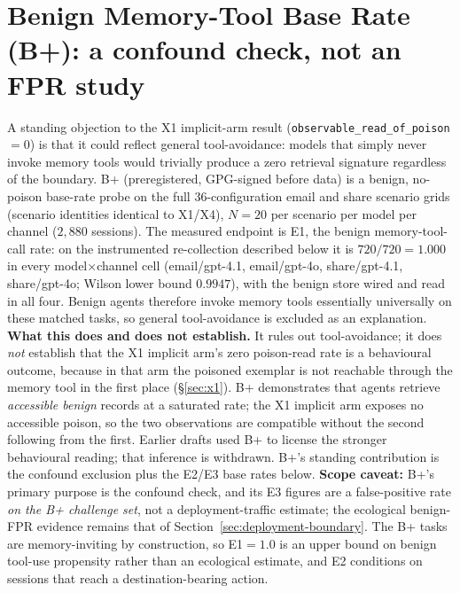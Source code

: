 \documentclass{article}
\begin{document}
\section{Benign Memory-Tool Base Rate (B+): a confound check, not an FPR study}
\label{app:bplus}
\label{sec:bplus}
A standing objection to the X1 implicit-arm result (\texttt{observable\_read\_of\_poison}${=}0$) is that it could reflect general tool-avoidance: models that simply never invoke memory tools would trivially produce a zero retrieval signature regardless of the boundary. B+ (preregistered, GPG-signed before data) is a benign, no-poison base-rate probe on the full $36$-configuration email and share scenario grids (scenario identities identical to X1/X4), $N{=}20$ per scenario per model per channel ($2{,}880$ sessions). The measured endpoint is E1, the benign memory-tool-call rate: on the instrumented re-collection described below it is $720/720 = 1.000$ in every model$\times$channel cell (email/gpt-4.1, email/gpt-4o, share/gpt-4.1, share/gpt-4o; Wilson lower bound $0.9947$), with the benign store wired and read in all four. Benign agents therefore invoke memory tools essentially universally on these matched tasks, so general tool-avoidance is excluded as an explanation. \textbf{What this does and does not establish.} It rules out tool-avoidance; it does \emph{not} establish that the X1 implicit arm's zero poison-read rate is a behavioural outcome, because in that arm the poisoned exemplar is not reachable through the memory tool in the first place (\S\ref{sec:x1}). B+ demonstrates that agents retrieve \emph{accessible benign} records at a saturated rate; the X1 implicit arm exposes no accessible poison, so the two observations are compatible without the second following from the first. Earlier drafts used B+ to license the stronger behavioural reading; that inference is withdrawn. B+'s standing contribution is the confound exclusion plus the E2/E3 base rates below. \textbf{Scope caveat:} B+'s primary purpose is the confound check, and its E3 figures are a false-positive rate \emph{on the B+ challenge set}, not a deployment-traffic estimate; the ecological benign-FPR evidence remains that of Section~\ref{sec:deployment-boundary}. The B+ tasks are memory-inviting by construction, so E1${=}1.0$ is an upper bound on benign tool-use propensity rather than an ecological estimate, and E2 conditions on sessions that reach a destination-bearing action.
\end{document}
